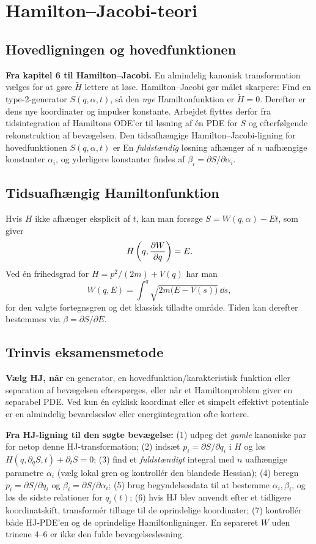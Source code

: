 \clearpage\section{Hamilton--Jacobi-teori}\label{sec:hj}
\subsection{Hovedligningen og hovedfunktionen}
\textbf{Fra kapitel 6 til Hamilton--Jacobi.}
En almindelig kanonisk transformation vælges for at gøre $\widetilde H$ lettere at løse. Hamilton--Jacobi gør målet skarpere: Find en type-2-generator $S(q,\alpha,t)$, så den \emph{nye} Hamiltonfunktion er $\widetilde H=0$. Derefter er dens nye koordinater og impulser konstante. Arbejdet flyttes derfor fra tidsintegration af Hamiltons ODE'er til løsning af én PDE for $S$ og efterfølgende rekonstruktion af bevægelsen.
Den tidsafhængige Hamilton--Jacobi-ligning for hovedfunktionen $S(q,\alpha,t)$ er
En \emph{fuldstændig} løsning afhænger af $n$ uafhængige konstanter $\alpha_i$, og yderligere konstanter findes af $\beta_i=\partial S/\partial\alpha_i$.
\subsection{Tidsuafhængig Hamiltonfunktion}
Hvis $H$ ikke afhænger eksplicit af $t$, kan man forsøge $S=W(q,\alpha)-Et$, som giver
\[H\left(q,\frac{\partial W}{\partial q}\right)=E.\]
Ved én frihedsgrad for $H=p^2/(2m)+V(q)$ har man
\[W(q,E)=\int^q\sqrt{2m\big(E-V(s)\big)}\,\dd s,\]
for den valgte fortegnsgren og det klassisk tilladte område. Tiden kan derefter bestemmes via $\beta=\partial S/\partial E$.
\subsection{Trinvis eksamensmetode}
\textbf{Vælg HJ, når} en generator, en hovedfunktion/karakteristisk funktion eller separation af bevægelsen efterspørges, eller når et Hamiltonproblem giver en separabel PDE. Ved kun én cyklisk koordinat eller et simpelt effektivt potentiale er en almindelig bevarelseslov eller energiintegration ofte kortere.
\begin{method}\textbf{Fra HJ-ligning til den søgte bevægelse:}
(1) udpeg det \emph{gamle} kanoniske par for netop denne HJ-transformation;
(2) indsæt $p_i=\partial S/\partial q_i$ i $H$ og løs $H(q,\partial_qS,t)+\partial_tS=0$;
(3) find et \emph{fuldstændigt} integral med $n$ uafhængige parametre $\alpha_i$ (vælg lokal gren og kontrollér den blandede Hessian);
(4) beregn $p_i=\partial S/\partial q_i$ og $\beta_i=\partial S/\partial\alpha_i$;
(5) brug begyndelsesdata til at bestemme $\alpha_i,\beta_i$, og løs de sidste relationer for $q_i(t)$;
(6) hvis HJ blev anvendt efter et tidligere koordinatskift, transformér tilbage til de oprindelige koordinater;
(7) kontrollér både HJ-PDE'en og de oprindelige Hamiltonligninger. En separeret $W$ uden trinene 4--6 er ikke den fulde bevægelsesløsning.\end{method}



